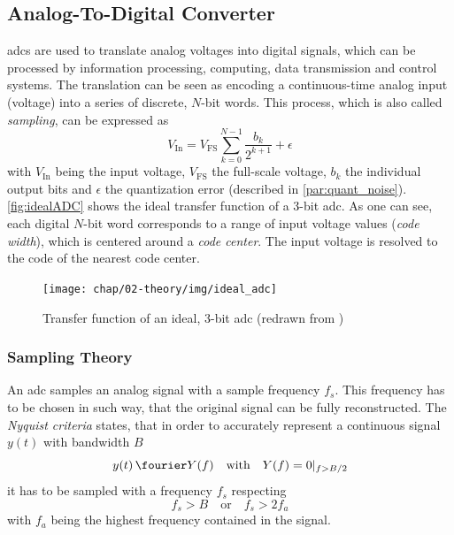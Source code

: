 \subsection{Analog-To-Digital Converter}
\Glspl{adc} are used to translate analog voltages into digital signals, which can be processed by information processing, computing, data transmission and control systems. The translation can be seen as encoding a continuous-time analog input (voltage) into a series of discrete, $N$-bit words. This process, which is also called \textit{sampling}, can be expressed as
\begin{equation}
	V_{\text{In}} = V_{\text{FS}} \sum_{k = 0}^{N-1} \frac{b_k}{2^{k+1}} + \epsilon
\end{equation}
with $V_{\text{In}}$ being the input voltage, $V_{\text{FS}}$ the full-scale voltage, $b_k$ the individual output bits and $\epsilon$ the quantization error (described in \autoref{par:quant_noise}). \autoref{fig:idealADC} shows the ideal transfer function of a 3-bit \gls{adc}. As one can see, each digital $N$-bit word corresponds to a range of input voltage values (\textit{code width}), which is centered around a \textit{code center}. The input voltage is resolved to the code of the nearest code center.
\begin{figure}[H]
	\centering
	\texttt{[image: chap/02-theory/img/ideal\_adc]}
	\caption[Transfer function of ideal, 3-bit ADC]{Transfer function of an ideal, 3-bit \gls{adc} (redrawn from \cite{Lundberg})}
	\label{fig:idealADC}
\end{figure}


\subsubsection*{Sampling Theory}
An \gls{adc} samples an analog signal with a sample frequency $f_s$.
This frequency has to be chosen in such way, that the original signal can be fully reconstructed.
The \textit{Nyquist criteria} states, that in order to accurately represent a continuous signal $y(t)$ with bandwidth $B$
\begin{equation}
	y (t) \, \fourier  Y(f) \quad \text{with} \quad Y(f)=0\vert_{f>B/2}
\end{equation}
it has to be sampled with a frequency $f_s$ respecting
\begin{equation}
	f_s > B \quad \text{or} \quad f_s > 2 f_a
\end{equation}
with $f_a$ being the highest frequency contained in the signal. \cite{walt,puente2015}

